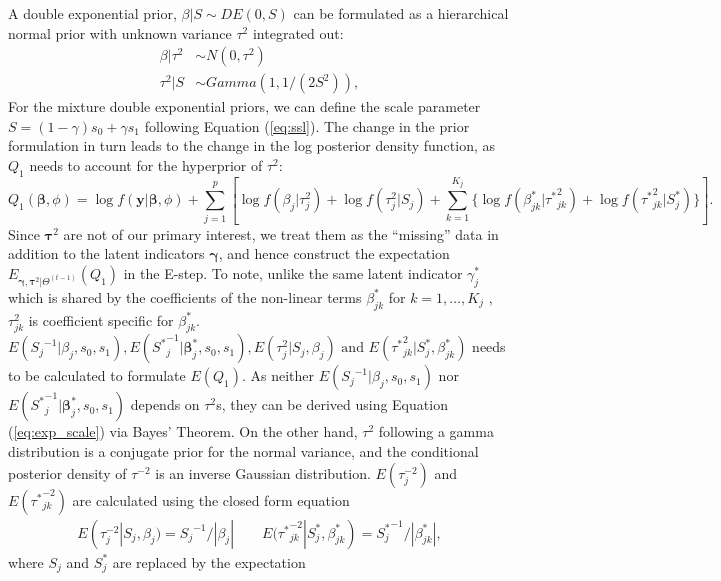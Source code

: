 \documentclass[AMA,STIX1COL,]{WileyNJD-v2}
\begin{document}
A double exponential prior, \(\beta|S \sim DE(0, S)\) can be formulated
as a hierarchical normal prior with unknown variance \(\tau^2\)
integrated out: \begin{align*}
  \beta|\tau^2 &\sim N(0, \tau^2)\\
  \tau^2|S & \sim Gamma(1, 1/(2S^2)), 
\end{align*} For the mixture double exponential priors, we can define
the scale parameter \(S = (1-\gamma)s_0 + \gamma s_1\) following
Equation (\ref{eq:ssl}). The change in the prior formulation in turn
leads to the change in the log posterior density function, as \(Q_1\)
needs to account for the hyperprior of \(\tau^2\):
\begin{equation}\label{eq:Q1_IWLS}
Q_1(\boldsymbol{\beta}, \phi) = \log f(\textbf{y}|\boldsymbol{\beta}, \phi) + \sum\limits_{j=1}^p\left[\log f(\beta_j|{\tau}^2_j) + \log f({\tau}^2_j| S_j)+\sum\limits_{k=1}^{K_j} \{\log f(\beta^{*}_{jk}|{\tau^{*}}^2_{jk})+\log f({\tau^*}^2_{jk}| S^*_j)\}\right].
\end{equation} Since \(\boldsymbol{\tau}^2\) are not of our primary
interest, we treat them as the ``missing'' data in addition to the
latent indicators \(\boldsymbol{\gamma}\), and hence construct the
expectation
\(E_{\boldsymbol{\gamma}, \boldsymbol{\tau}^2|\Theta^{(t-1)}}(Q_1)\) in
the E-step. To note, unlike the same latent indicator \(\gamma^*_j\)
which is shared by the coefficients of the non-linear terms
\(\beta^*_{jk}\) for \(k = 1, \dots, K_j\) , \(\tau^2_{jk}\) is
coefficient specific for \(\beta^*_{jk}\).
\(E({S_j}^{-1}|\beta_j, s_0, s_1), E({S^*}^{-1}_j|\boldsymbol{\beta}_j^*, s_0, s_1), E({\tau}^2_{j}|S_j, \beta_j) \text{ and } E({\tau^*}^2_{jk}|S_j^*, \beta^*_{jk})\)
needs to be calculated to formulate \(E(Q_1)\). As neither
\(E({S_j}^{-1}|\beta_j, s_0, s_1)\) nor
\(E({S^*}^{-1}_j|\boldsymbol{\beta}_j^*, s_0, s_1)\) depends on
\(\tau^2\)s, they can be derived using Equation (\ref{eq:exp_scale}) via
Bayes' Theorem. On the other hand, \(\tau^{2}\) following a gamma
distribution is a conjugate prior for the normal variance, and the
conditional posterior density of \(\tau^{-2}\) is an inverse Gaussian
distribution. \(E({\tau}^{-2}_{j})\) and \(E({\tau^*}^{-2}_{jk})\) are
calculated using the closed form equation \begin{align*}
 E({\tau}^{-2}_{j}|S_j, \beta_j) ={S_j}^{-1}/|\beta_j| \qquad E({\tau^*}^{-2}_{jk}|S_j^*, \beta^*_{jk})={S_j^*}^{-1}/|\beta^*_{jk}|,
\end{align*} where \(S_j\) and \(S_j^*\) are replaced by the expectation
\end{document}
